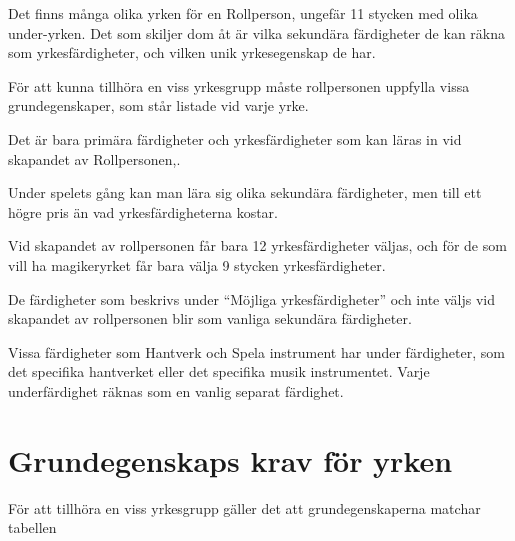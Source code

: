 \documentclass[a4paper, 10pt, titlepage]{article}
\begin{document}
Det finns många olika yrken för en Rollperson, ungefär 11 stycken med olika under-yrken.
Det som skiljer dom åt är vilka sekundära färdigheter de kan räkna som yrkesfärdigheter, och
vilken unik yrkesegenskap de har.

För att kunna tillhöra en viss yrkesgrupp måste rollpersonen uppfylla vissa grundegenskaper, som
står listade vid varje yrke.

Det är bara primära färdigheter och yrkesfärdigheter som kan läras in vid skapandet av Rollpersonen,.

Under spelets gång kan man lära sig olika sekundära färdigheter, men till ett högre pris än vad
yrkesfärdigheterna kostar.

Vid skapandet av rollpersonen får bara 12 yrkesfärdigheter väljas, och för de som vill ha
magikeryrket får bara välja 9 stycken yrkesfärdigheter.

De färdigheter som beskrivs under ``Möjliga yrkesfärdigheter'' och inte väljs vid skapandet av
rollpersonen blir som vanliga sekundära färdigheter.

Vissa färdigheter som Hantverk och Spela instrument har under färdigheter, som det specifika hantverket
eller det specifika musik instrumentet. Varje underfärdighet räknas som en vanlig separat färdighet.

\newpage
\section{Grundegenskaps krav för yrken}
För att tillhöra en viss yrkesgrupp gäller det att grundegenskaperna matchar tabellen
\end{document}
